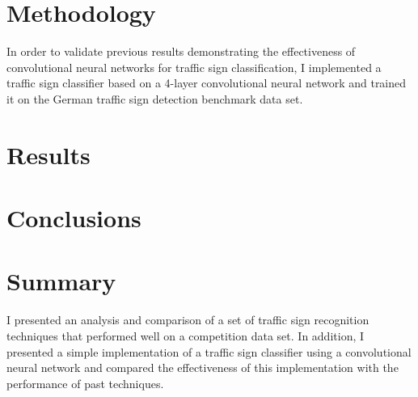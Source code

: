 \documentclass[letterpaper,twocolumn,10pt]{article}
\begin{document}


\section{Methodology}

In order to validate previous results demonstrating the effectiveness of convolutional neural networks for traffic sign classification, I implemented a traffic sign classifier based on a 4-layer convolutional neural network and trained it on the German traffic sign detection benchmark data set. 


\section{Results}


\section{Conclusions}


\section{Summary}

I presented an analysis and comparison of a set of traffic sign recognition techniques that performed well on a competition data set. In addition, I presented a simple implementation of a traffic sign classifier using a convolutional neural network and compared the effectiveness of this implementation with the performance of past techniques.


{\footnotesize 
}
\end{document}
